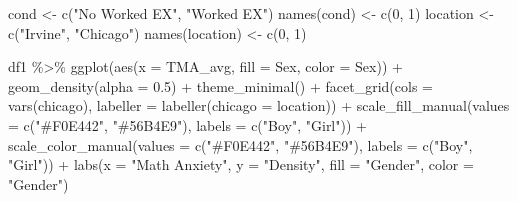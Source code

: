 \documentclass[
  letterpaper,
  DIV=11,
  numbers=noendperiod]{scrartcl}
\newenvironment{Shaded}{\begin{snugshade}}{\end{snugshade}}
\newcommand{\AttributeTok}[1]{\textcolor[rgb]{0.49,0.56,0.16}{#1}}
\newcommand{\DecValTok}[1]{\textcolor[rgb]{0.25,0.63,0.44}{#1}}
\newcommand{\FloatTok}[1]{\textcolor[rgb]{0.25,0.63,0.44}{#1}}
\newcommand{\FunctionTok}[1]{\textcolor[rgb]{0.02,0.16,0.49}{#1}}
\newcommand{\NormalTok}[1]{\textcolor[rgb]{0.00,0.44,0.13}{#1}}
\newcommand{\OtherTok}[1]{\textcolor[rgb]{0.00,0.44,0.13}{#1}}
\newcommand{\SpecialCharTok}[1]{\textcolor[rgb]{0.25,0.44,0.63}{#1}}
\newcommand{\StringTok}[1]{\textcolor[rgb]{0.25,0.44,0.63}{#1}}
\begin{document}
\begin{Shaded}
\begin{Highlighting}[]
\NormalTok{cond }\OtherTok{\textless{}{-}} \FunctionTok{c}\NormalTok{(}\StringTok{"No Worked EX"}\NormalTok{, }\StringTok{"Worked EX"}\NormalTok{)}
\FunctionTok{names}\NormalTok{(cond) }\OtherTok{\textless{}{-}} \FunctionTok{c}\NormalTok{(}\DecValTok{0}\NormalTok{, }\DecValTok{1}\NormalTok{)}
\NormalTok{location }\OtherTok{\textless{}{-}} \FunctionTok{c}\NormalTok{(}\StringTok{"Irvine"}\NormalTok{, }\StringTok{"Chicago"}\NormalTok{)}
\FunctionTok{names}\NormalTok{(location) }\OtherTok{\textless{}{-}} \FunctionTok{c}\NormalTok{(}\DecValTok{0}\NormalTok{, }\DecValTok{1}\NormalTok{)}

\NormalTok{df1 }\SpecialCharTok{\%\textgreater{}\%} \FunctionTok{ggplot}\NormalTok{(}\FunctionTok{aes}\NormalTok{(}\AttributeTok{x =}\NormalTok{ TMA\_avg, }\AttributeTok{fill =}\NormalTok{ Sex,}
                   \AttributeTok{color =}\NormalTok{ Sex)) }\SpecialCharTok{+}
  \FunctionTok{geom\_density}\NormalTok{(}\AttributeTok{alpha =} \FloatTok{0.5}\NormalTok{) }\SpecialCharTok{+}
  \FunctionTok{theme\_minimal}\NormalTok{() }\SpecialCharTok{+}
  \FunctionTok{facet\_grid}\NormalTok{(}\AttributeTok{cols =} \FunctionTok{vars}\NormalTok{(chicago),}
             \AttributeTok{labeller =} \FunctionTok{labeller}\NormalTok{(}\AttributeTok{chicago =}\NormalTok{ location)) }\SpecialCharTok{+}
  \FunctionTok{scale\_fill\_manual}\NormalTok{(}\AttributeTok{values =} \FunctionTok{c}\NormalTok{(}\StringTok{"\#F0E442"}\NormalTok{, }\StringTok{"\#56B4E9"}\NormalTok{), }\AttributeTok{labels =} \FunctionTok{c}\NormalTok{(}\StringTok{"Boy"}\NormalTok{, }\StringTok{"Girl"}\NormalTok{)) }\SpecialCharTok{+}
  \FunctionTok{scale\_color\_manual}\NormalTok{(}\AttributeTok{values =} \FunctionTok{c}\NormalTok{(}\StringTok{"\#F0E442"}\NormalTok{, }\StringTok{"\#56B4E9"}\NormalTok{), }\AttributeTok{labels =} \FunctionTok{c}\NormalTok{(}\StringTok{"Boy"}\NormalTok{, }\StringTok{"Girl"}\NormalTok{)) }\SpecialCharTok{+}
  \FunctionTok{labs}\NormalTok{(}\AttributeTok{x =} \StringTok{"Math Anxiety"}\NormalTok{, }\AttributeTok{y =} \StringTok{"Density"}\NormalTok{,}
       \AttributeTok{fill =} \StringTok{"Gender"}\NormalTok{, }\AttributeTok{color =} \StringTok{"Gender"}\NormalTok{)}
\end{Highlighting}
\end{Shaded}
\end{document}
